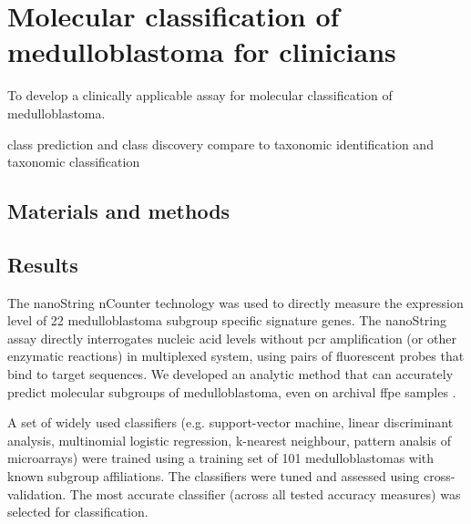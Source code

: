 \chapter{Molecular classification of medulloblastoma for clinicians}
\label{ch:mb-class}

\begin{objective}
To develop a clinically applicable assay for molecular classification of medulloblastoma.
\end{objective}

class prediction and class discovery
compare to taxonomic identification and taxonomic classification

\section{Materials and methods}


\section{Results}

The nanoString nCounter technology  was used to directly measure the expression level of 22 medulloblastoma subgroup specific signature genes. The nanoString assay directly interrogates nucleic acid levels without \gls{pcr} amplification (or other enzymatic reactions) in multiplexed system, using pairs of fluorescent probes that bind to target sequences. We developed an analytic method that can accurately predict molecular subgroups of medulloblastoma, even on archival \gls{ffpe} samples .

A set of widely used classifiers (e.g. support-vector machine, linear discriminant analysis, multinomial logistic regression, k-nearest neighbour, pattern analsis of microarrays) were trained using a training set of 101 medulloblastomas with known subgroup affiliations. The classifiers were tuned and assessed using cross-validation. The most accurate classifier (across all tested accuracy measures) was selected for classification.

